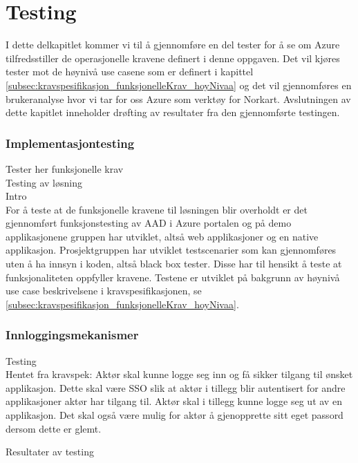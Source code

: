 \chapter{Testing}
\label{chap:testing}
I dette delkapitlet kommer vi til å gjennomføre en del tester for å se om Azure tilfredsstiller de operasjonelle kravene definert i denne oppgaven. Det vil kjøres tester mot de høynivå use casene som er definert i kapittel \ref{subsec:kravspesifikasjon_funksjonelleKrav_hoyNivaa}  og det vil gjennomføres en brukeranalyse hvor vi tar for oss Azure som verktøy for Norkart. Avslutningen av dette kapitlet inneholder drøfting av resultater fra den gjennomførte testingen.

\subsection{Implementasjontesting}
\label{sec:testing_implementasjontesting}
Tester her funksjonelle krav \\
Testing av løsning \\

Intro\\
For å teste at de funksjonelle kravene til løsningen blir overholdt er det gjennomført funksjonstesting av AAD i Azure portalen og på demo applikasjonene gruppen har utviklet, altså web applikasjoner og en native applikasjon. Prosjektgruppen har utviklet testscenarier som kan gjennomføres uten å ha innsyn i koden, altså black box tester. Disse har til hensikt å teste at funksjonaliteten oppfyller kravene. Testene er utviklet på bakgrunn av høynivå use case beskrivelsene i kravspesifikasjonen, se \ref{subsec:kravspesifikasjon_funksjonelleKrav_hoyNivaa}.

\subsection{Innloggingsmekanismer}
\label{sec:testing_innloggingsmekanismer}
Testing \\
Hentet fra kravspek:
Aktør skal kunne logge seg inn og få sikker tilgang til ønsket applikasjon. Dette skal være SSO slik at aktør i tillegg blir autentisert for andre applikasjoner aktør har tilgang til. Aktør skal i tillegg kunne logge seg ut av en applikasjon. Det skal også være mulig for aktør å gjenopprette sitt eget passord dersom dette er glemt.


Resultater av testing \\

